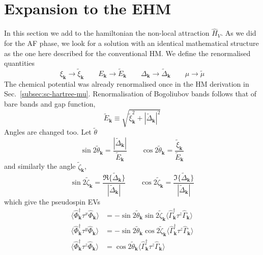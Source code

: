 \section{Expansion to the EHM}\label{sec:sc-ehm}

In this section we add to the hamiltonian the non-local attraction $\hat H_V$. As we did for the AF phase, we look for a solution with an identical mathematical structure as the one here described for the conventional HM. We define the renormalised quantities
\[
	\xi_\mathbf{k} \to \tilde{\xi}_\mathbf{k}
	\qquad
	E_\mathbf{k} \to \tilde{E}_\mathbf{k}
	\qquad
	\Delta_\mathbf{k} \to \tilde{\Delta}_\mathbf{k}
	\qquad
	\mu \to \tilde{\mu}
\]
The chemical potential was already renormalised once in the HM derivation in Sec.~\ref{subsec:sc-hartree-mu}. Renormalisation of Bogoliubov bands follows that of bare bands and gap function, 
\[
	\tilde{E}_\mathbf{k} \equiv \sqrt{\tilde{\xi}_\mathbf{k}^2 + |\tilde{\Delta}_\mathbf{k}|^2}
\]
Angles are changed too. Let $\tilde{\theta}$
\begin{equation}\label{eq:sc-ehm-(~theta)}
	\sin 2\tilde{\theta}_\mathbf{k} = \frac{|\tilde{\Delta}_\mathbf{k}|}{\tilde{E}_\mathbf{k}}
	\qquad
	\cos 2\tilde{\theta}_\mathbf{k} = \frac{\tilde{\xi}_\mathbf{k}}{\tilde{E}_\mathbf{k}}
\end{equation}
and similarly the angle $\tilde{\zeta}_\mathbf{k}$,
\begin{equation}\label{eq:sc-ehm-(~zeta)}
	\sin 2\tilde{\zeta}_\mathbf{k} = \frac{\Re\{\tilde{\Delta}_\mathbf{k}\}}{|\tilde{\Delta}_\mathbf{k}|}
	\qquad
	\cos 2\tilde{\zeta}_\mathbf{k} = \frac{\Im\{\tilde{\Delta}_\mathbf{k}\}}{|\tilde{\Delta}_\mathbf{k}|}
\end{equation}
which give the pseudospin EVs
\begin{align}
	\langle \hat \Phi_\mathbf{k}^\dagger \tau^x \hat \Phi_\mathbf{k} \rangle &= -\sin 2\tilde{\theta}_\mathbf{k} \sin 2\tilde{\zeta}_\mathbf{k} \langle \hat \Gamma_\mathbf{k}^\dagger \tau^z \hat \Gamma_\mathbf{k} \rangle \label{eq:sc-x-expectation-non-local} \\
	\langle \hat \Phi_\mathbf{k}^\dagger \tau^y \hat \Phi_\mathbf{k} \rangle &= -\sin 2\tilde{\theta}_\mathbf{k} \cos 2\tilde{\zeta}_\mathbf{k} \langle \hat \Gamma_\mathbf{k}^\dagger \tau^z \hat \Gamma_\mathbf{k} \rangle \label{eq:sc-y-expectation-non-local} \\
	\langle \hat \Phi_\mathbf{k}^\dagger \tau^z \hat \Phi_\mathbf{k} \rangle &= \cos 2\tilde{\theta}_\mathbf{k} \langle \hat \Gamma_\mathbf{k}^\dagger \tau^z \hat \Gamma_\mathbf{k} \rangle \label{eq:sc-z-expectation-non-local}
\end{align}

